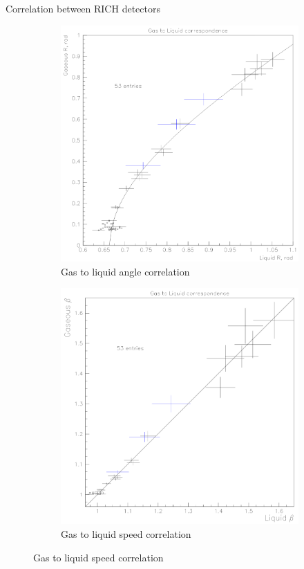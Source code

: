 \documentclass{beamer}
\begin{document}
\begin{frame}{Correlation between RICH detectors}
  \begin{figure}
    \centering
    \begin{subfigure}{0.5\textwidth}
      \includegraphics[width = 1\textwidth]{AngleCorrelation.png}
      \caption{Gas to liquid angle correlation}
    \end{subfigure}%
    \begin{subfigure}{0.5\textwidth}
      \includegraphics[width = 1\textwidth]{SpeedCorrelation.png}
      \caption{Gas to liquid speed correlation}
    \end{subfigure}
  \end{figure}
\end{frame}
\end{document}
